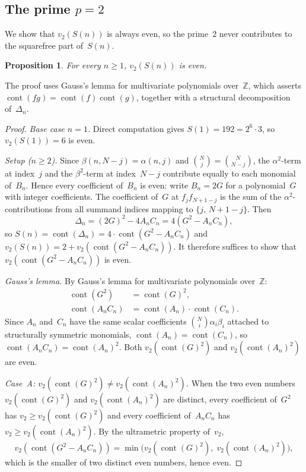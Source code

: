 \documentclass[10pt]{amsart}
\newtheorem{proposition}[theorem]{Proposition}
\theoremstyle{definition}
\theoremstyle{remark}
\DeclareMathOperator{\cont}{cont}
\newcommand{\BZ}{\mathbb{Z}}
\begin{document}
\subsection{The prime $p=2$}\label{subsec:p2}

We show that $v_2(S(n))$ is always even, so the prime~$2$ never
contributes to the squarefree part of~$S(n)$.

\begin{proposition}\label{prop:p2}
For every $n \ge 1$, $v_2(S(n))$ is even.
\end{proposition}

The proof uses Gauss's lemma for multivariate polynomials over~$\BZ$,
which asserts $\cont(fg) = \cont(f)\cont(g)$, together with a structural
decomposition of~$\Delta_n$.

\begin{proof}
\emph{Base case $n=1$.}
Direct computation gives $S(1)=192=2^6\cdot3$, so $v_2(S(1))=6$ is even.

\medskip\noindent\emph{Setup ($n\ge 2$).}
Since $\beta(n,N{-}j) = \alpha(n,j)$ and $\binom{N}{j}=\binom{N}{N{-}j}$,
the $\alpha^2$-term at index~$j$ and the $\beta^2$-term at index~$N{-}j$
contribute equally to each monomial of~$B_n$.  Hence every coefficient
of~$B_n$ is even: write $B_n = 2G$ for a polynomial~$G$ with integer
coefficients.  The coefficient of~$G$ at $f_jf_{N+1-j}$ is the sum of the
$\alpha^2$-contributions from all summand indices mapping to
$\{j,\,N{+}1{-}j\}$.
Then
\[
\Delta_n = (2G)^2 - 4A_nC_n = 4(G^2 - A_nC_n),
\]
so $S(n) = \cont(\Delta_n) = 4\cdot\cont(G^2 - A_nC_n)$ and
$v_2(S(n)) = 2 + v_2(\cont(G^2-A_nC_n))$.  It therefore suffices to
show that $v_2(\cont(G^2-A_nC_n))$ is even.

\medskip\noindent\emph{Gauss's lemma.}
By Gauss's lemma for multivariate polynomials over~$\BZ$:
\begin{align*}
\cont(G^2) &= \cont(G)^2, \\
\cont(A_nC_n) &= \cont(A_n)\cdot\cont(C_n).
\end{align*}
Since $A_n$ and~$C_n$ have the same scalar coefficients
$\binom{N}{i}\alpha_i\beta_i$ attached to structurally symmetric
monomials, $\cont(A_n)=\cont(C_n)$, so
$\cont(A_nC_n)=\cont(A_n)^2$.
Both $v_2(\cont(G)^2)$ and $v_2(\cont(A_n)^2)$ are even.

\medskip\noindent\emph{Case~A: $v_2(\cont(G)^2)\ne v_2(\cont(A_n)^2)$.}
When the two even numbers $v_2(\cont(G)^2)$ and $v_2(\cont(A_n)^2)$
are distinct, every coefficient of~$G^2$ has $v_2 \ge v_2(\cont(G)^2)$
and every coefficient of~$A_nC_n$ has $v_2 \ge v_2(\cont(A_n)^2)$.
By the ultrametric property of~$v_2$,
\[
v_2(\cont(G^2-A_nC_n))
= \min\bigl(v_2(\cont(G)^2),\; v_2(\cont(A_n)^2)\bigr),
\]
which is the smaller of two distinct even numbers, hence even.


\end{proof}
\end{document}
